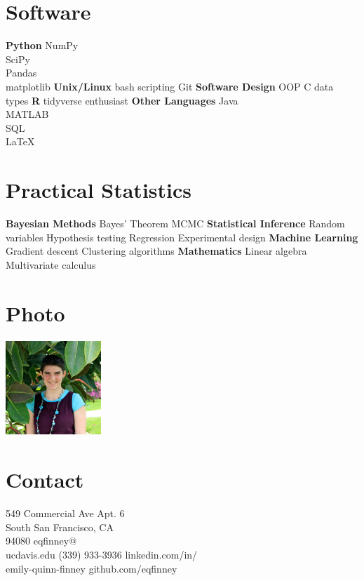 \documentclass[]{cv-style}          %
\begin{document}
\begin{aside}
%
\section{Software}
\textbf{Python}
NumPy\\ SciPy\\ Pandas\\ matplotlib
\textbf{Unix/Linux}
bash scripting
Git
\textbf{Software Design}
OOP
C data types
\textbf{R}
tidyverse enthusiast
\textbf{Other Languages}
Java\\ MATLAB\\ SQL\\ \LaTeX
%
\section{Practical Statistics}
\textbf{Bayesian Methods}
Bayes' Theorem
MCMC
\textbf{Statistical Inference}
Random variables
Hypothesis testing
Regression
Experimental design
\textbf{Machine Learning}
Gradient descent
Clustering algorithms
\textbf{Mathematics}
Linear algebra
Multivariate calculus
%
\section{Photo}
\includegraphics[width=3.6cm,height=3.6cm]{headshot.jpg}
%
\section{Contact}
549 Commercial Ave Apt. 6\\ South San Francisco, CA \\\hspace{0.5cm}94080
%
eqfinney@\\\hspace{0.5cm}ucdavis.edu
%
(339) 933-3936
%
linkedin.com/in/\\\hspace{0.5cm}emily-quinn-finney
%
github.com/eqfinney
%
\end{aside}
\end{document}
